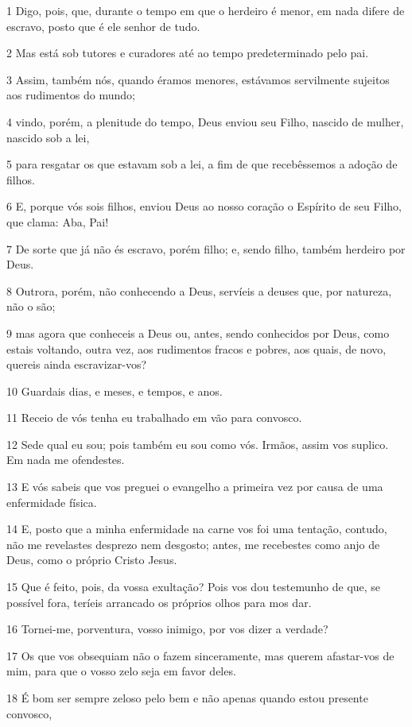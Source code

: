 \par 1 Digo, pois, que, durante o tempo em que o herdeiro é menor, em nada difere de escravo, posto que é ele senhor de tudo.
\par 2 Mas está sob tutores e curadores até ao tempo predeterminado pelo pai.
\par 3 Assim, também nós, quando éramos menores, estávamos servilmente sujeitos aos rudimentos do mundo;
\par 4 vindo, porém, a plenitude do tempo, Deus enviou seu Filho, nascido de mulher, nascido sob a lei,
\par 5 para resgatar os que estavam sob a lei, a fim de que recebêssemos a adoção de filhos.
\par 6 E, porque vós sois filhos, enviou Deus ao nosso coração o Espírito de seu Filho, que clama: Aba, Pai!
\par 7 De sorte que já não és escravo, porém filho; e, sendo filho, também herdeiro por Deus.
\par 8 Outrora, porém, não conhecendo a Deus, servíeis a deuses que, por natureza, não o são;
\par 9 mas agora que conheceis a Deus ou, antes, sendo conhecidos por Deus, como estais voltando, outra vez, aos rudimentos fracos e pobres, aos quais, de novo, quereis ainda escravizar-vos?
\par 10 Guardais dias, e meses, e tempos, e anos.
\par 11 Receio de vós tenha eu trabalhado em vão para convosco.
\par 12 Sede qual eu sou; pois também eu sou como vós. Irmãos, assim vos suplico. Em nada me ofendestes.
\par 13 E vós sabeis que vos preguei o evangelho a primeira vez por causa de uma enfermidade física.
\par 14 E, posto que a minha enfermidade na carne vos foi uma tentação, contudo, não me revelastes desprezo nem desgosto; antes, me recebestes como anjo de Deus, como o próprio Cristo Jesus.
\par 15 Que é feito, pois, da vossa exultação? Pois vos dou testemunho de que, se possível fora, teríeis arrancado os próprios olhos para mos dar.
\par 16 Tornei-me, porventura, vosso inimigo, por vos dizer a verdade?
\par 17 Os que vos obsequiam não o fazem sinceramente, mas querem afastar-vos de mim, para que o vosso zelo seja em favor deles.
\par 18 É bom ser sempre zeloso pelo bem e não apenas quando estou presente convosco,
